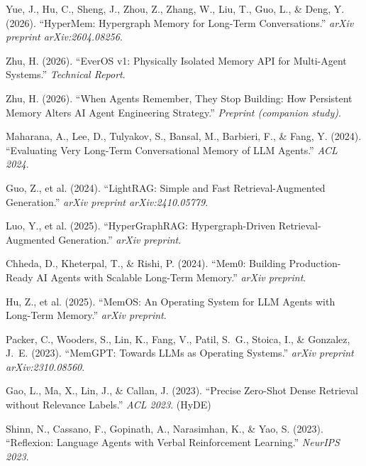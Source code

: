 \documentclass[11pt, a4paper]{article}
\begin{document}
{\small
\begin{enumerate}[label={[\arabic*]}, leftmargin=2em, itemsep=2pt]
  \item Yue, J., Hu, C., Sheng, J., Zhou, Z., Zhang, W., Liu, T., Guo, L., \& Deng, Y. (2026). ``HyperMem: Hypergraph Memory for Long-Term Conversations.'' \textit{arXiv preprint arXiv:2604.08256}.
  \item Zhu, H. (2026). ``EverOS v1: Physically Isolated Memory API for Multi-Agent Systems.'' \textit{Technical Report}.
  \item Zhu, H. (2026). ``When Agents Remember, They Stop Building: How Persistent Memory Alters AI Agent Engineering Strategy.'' \textit{Preprint (companion study)}.
  \item Maharana, A., Lee, D., Tulyakov, S., Bansal, M., Barbieri, F., \& Fang, Y. (2024). ``Evaluating Very Long-Term Conversational Memory of LLM Agents.'' \textit{ACL 2024}.
  \item Guo, Z., et al. (2024). ``LightRAG: Simple and Fast Retrieval-Augmented Generation.'' \textit{arXiv preprint arXiv:2410.05779}.
  \item Luo, Y., et al. (2025). ``HyperGraphRAG: Hypergraph-Driven Retrieval-Augmented Generation.'' \textit{arXiv preprint}.
  \item Chheda, D., Kheterpal, T., \& Rishi, P. (2024). ``Mem0: Building Production-Ready AI Agents with Scalable Long-Term Memory.'' \textit{arXiv preprint}.
  \item Hu, Z., et al. (2025). ``MemOS: An Operating System for LLM Agents with Long-Term Memory.'' \textit{arXiv preprint}.
  \item Packer, C., Wooders, S., Lin, K., Fang, V., Patil, S.~G., Stoica, I., \& Gonzalez, J.~E. (2023). ``MemGPT: Towards LLMs as Operating Systems.'' \textit{arXiv preprint arXiv:2310.08560}.
  \item Gao, L., Ma, X., Lin, J., \& Callan, J. (2023). ``Precise Zero-Shot Dense Retrieval without Relevance Labels.'' \textit{ACL 2023}. (HyDE)
  \item Shinn, N., Cassano, F., Gopinath, A., Narasimhan, K., \& Yao, S. (2023). ``Reflexion: Language Agents with Verbal Reinforcement Learning.'' \textit{NeurIPS 2023}.
\end{enumerate}
}
\end{document}
